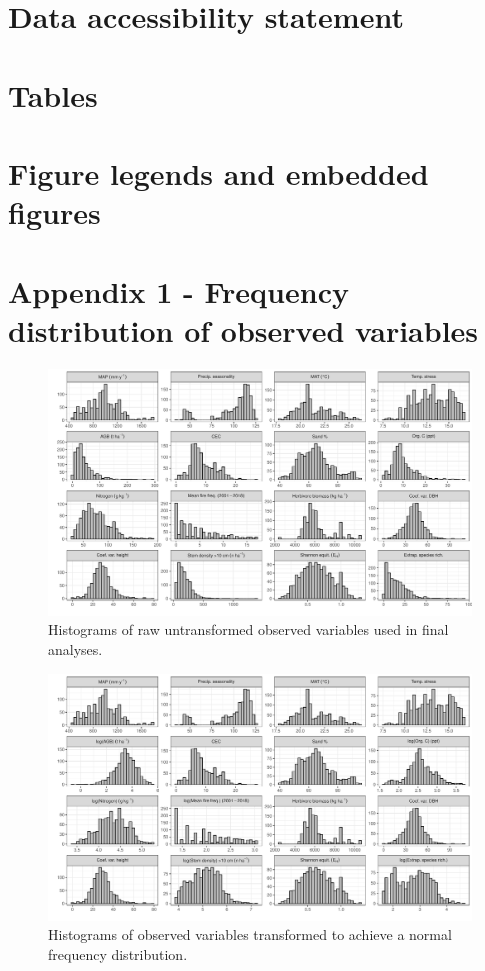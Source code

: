 \documentclass[11pt,a4paper]{article}
\begin{document}
\newpage{}
\appendix{}

\section{Data accessibility statement}

\section{Tables}

\section{Figure legends and embedded figures}

\section{Appendix 1 - Frequency distribution of observed variables} \label{appendixa}

\begin{figure}[H]
\centering
	\includegraphics[width=\textwidth]{hist_raw}
	\caption{Histograms of raw untransformed observed variables used in final analyses.}
	\label{hist_raw}
\end{figure}

\begin{figure}[H]
\centering
	\includegraphics[width=\textwidth]{hist_trans}
	\caption{Histograms of observed variables transformed to achieve a normal frequency distribution.}
	\label{hist_trans}
\end{figure}
\end{document}
